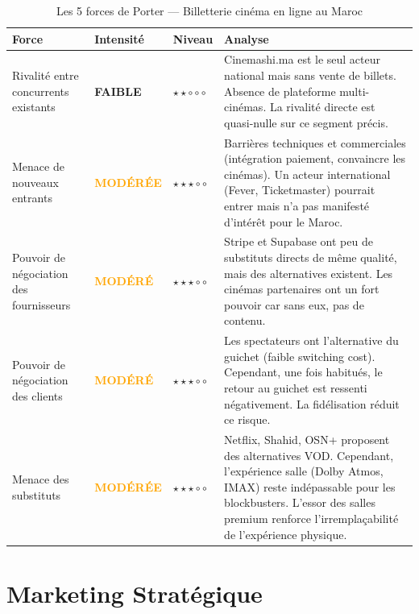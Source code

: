 \documentclass[12pt,a4paper,openany]{report}
\begin{document}
\begin{table}[H]
\centering
\small
\setlength{\tabcolsep}{5pt}
\renewcommand{\arraystretch}{1.25}
\begin{tabularx}{\textwidth}{%
  >{\raggedright\arraybackslash}p{3.2cm}%
  >{\centering\arraybackslash}p{1.8cm}%
  >{\centering\arraybackslash}p{1.5cm}%
  >{\raggedright\arraybackslash}X}
\toprule
\textbf{Force} & \textbf{Intensité} & \textbf{Niveau} & \textbf{Analyse} \\
\midrule
Rivalité entre concurrents existants & \textcolor{green!60!black}{\textbf{FAIBLE}} & $\star\star\circ\circ\circ$ & Cinemashi.ma est le seul acteur national mais sans vente de billets. Absence de plateforme multi-cinémas. La rivalité directe est quasi-nulle sur ce segment précis. \\
\midrule
Menace de nouveaux entrants & \textcolor{orange}{\textbf{MODÉRÉE}} & $\star\star\star\circ\circ$ & Barrières techniques et commerciales (intégration paiement, convaincre les cinémas). Un acteur international (Fever, Ticketmaster) pourrait entrer mais n'a pas manifesté d'intérêt pour le Maroc. \\
\midrule
Pouvoir de négociation des fournisseurs & \textcolor{orange}{\textbf{MODÉRÉ}} & $\star\star\star\circ\circ$ & Stripe et Supabase ont peu de substituts directs de même qualité, mais des alternatives existent. Les cinémas partenaires ont un fort pouvoir car sans eux, pas de contenu. \\
\midrule
Pouvoir de négociation des clients & \textcolor{orange}{\textbf{MODÉRÉ}} & $\star\star\star\circ\circ$ & Les spectateurs ont l'alternative du guichet (faible switching cost). Cependant, une fois habitués, le retour au guichet est ressenti négativement. La fidélisation réduit ce risque. \\
\midrule
Menace des substituts & \textcolor{orange}{\textbf{MODÉRÉE}} & $\star\star\star\circ\circ$ & Netflix, Shahid, OSN+ proposent des alternatives VOD. Cependant, l'expérience salle (Dolby Atmos, IMAX) reste indépassable pour les blockbusters. L'essor des salles premium renforce l'irrempla\c{c}abilité de l'expérience physique. \\
\bottomrule
\end{tabularx}
\caption{Les 5 forces de Porter — Billetterie cinéma en ligne au Maroc}
\label{tab:porter}
\end{table}

\section{Marketing Stratégique}
\end{document}
